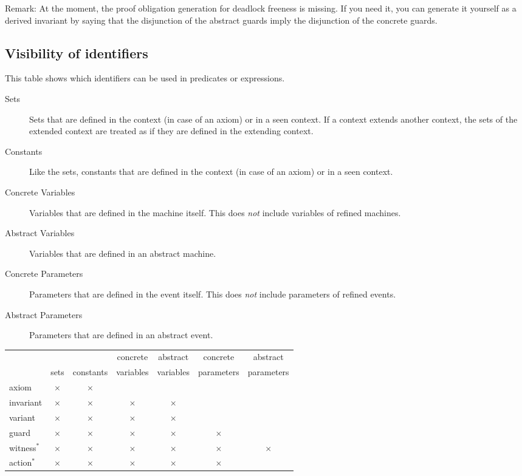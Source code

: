 Remark: At the moment, the proof obligation generation for deadlock freeness is missing. If you need it, you can generate it yourself as a derived invariant by saying that the disjunction of the abstract guards imply the disjunction of the concrete guards.

\subsection{Visibility of identifiers}
\label{visibility_of_identifiers}

This table shows which identifiers can be used in predicates or expressions. 
\begin{description}
\item[Sets] Sets that are defined in the context (in case of an axiom) or in a seen context.
  If a context extends another context, the sets of the extended context are treated as if they
  are defined in the extending context.
\item[Constants] Like the sets, constants that are defined in the context (in case of an axiom) or
  in a seen context.
\item[Concrete Variables] Variables that are defined in the machine itself. This does \emph{not}
  include variables of refined machines.
\item[Abstract Variables] Variables that are defined in an abstract machine.
\item[Concrete Parameters] Parameters that are defined in the event itself. This does \emph{not}
  include parameters of refined events.
\item[Abstract Parameters] Parameters that are defined in an abstract event.
\end{description}

\begin{center}
  \newcommand{\markcell}{$\times$}
  \begin{tabular}{lcccccc}
  \hline
            &           &           & concrete  & abstract  & concrete   & abstract \\
            & sets      & constants & variables & variables & parameters & parameters \\
  \hline
  axiom     & \markcell & \markcell &           &           &            & \\
  invariant & \markcell & \markcell & \markcell & \markcell &            & \\
  variant   & \markcell & \markcell & \markcell & \markcell &            & \\
  guard     & \markcell & \markcell & \markcell & \markcell & \markcell  & \\
  witness$^{*}$   & \markcell & \markcell & \markcell & \markcell & \markcell  & \markcell \\
  action$^{*}$    & \markcell & \markcell & \markcell & \markcell & \markcell  &  \\
  \hline
  \end{tabular}    
\end{center}


